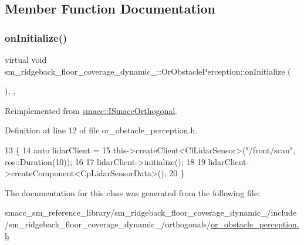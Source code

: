 \subsection{Member Function Documentation}
\mbox{\label{classsm__ridgeback__floor__coverage__dynamic__1_1_1OrObstaclePerception_a689e4709ac00f184357cd490f8cd3b69}} 
\subsubsection{\texorpdfstring{on\+Initialize()}{onInitialize()}}
{\footnotesize\ttfamily virtual void sm\+\_\+ridgeback\+\_\+floor\+\_\+coverage\+\_\+dynamic\+\_\+::\+Or\+Obstacle\+Perception\+::on\+Initialize (\begin{DoxyParamCaption}{ }\end{DoxyParamCaption})\hspace{0.3cm}{\ttfamily [inline]}, {\ttfamily [override]}, {\ttfamily [virtual]}}



Reimplemented from \hyperlink{classsmacc_1_1ISmaccOrthogonal_a6bb31c620cb64dd7b8417f8705c79c7a}{smacc\+::\+I\+Smacc\+Orthogonal}.



Definition at line 12 of file or\+\_\+obstacle\+\_\+perception.\+h.


\begin{DoxyCode}
13     \{
14         \textcolor{keyword}{auto} lidarClient =
15             this->createClient<ClLidarSensor>(\textcolor{stringliteral}{"/front/scan"}, ros::Duration(10));
16 
17         lidarClient->initialize();
18 
19         lidarClient->createComponent<CpLidarSensorData>();
20     \}
\end{DoxyCode}


The documentation for this class was generated from the following file\+:\begin{DoxyCompactItemize}
\item 
smacc\+\_\+sm\+\_\+reference\+\_\+library/sm\+\_\+ridgeback\+\_\+floor\+\_\+coverage\+\_\+dynamic\+\_/include/sm\+\_\+ridgeback\+\_\+floor\+\_\+coverage\+\_\+dynamic\+\_/orthogonals/\hyperlink{sm__ridgeback__floor__coverage__dynamic__1_2include_2sm__ridgeback__floor__coverage__dynamic__1_ce252ac0da8474a4e18e78c91c23b65c}{or\+\_\+obstacle\+\_\+perception.\+h}\end{DoxyCompactItemize}
